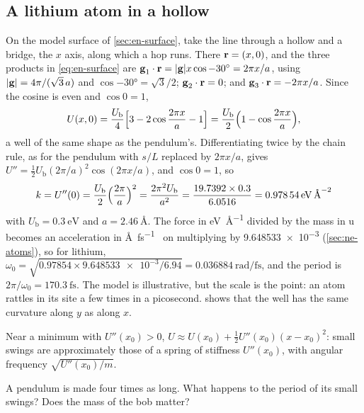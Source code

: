 \subsection*{A lithium atom in a hollow}

On the model surface of \cref{sec:en-surface}, take the line through a
hollow and a bridge, the $x$ axis, along which a hop runs. There $\bm{\mathrm{r}} =
(x, 0)$, and the three products in \cref{eq:en-surface} are $\bm{\mathrm{g}}_1\cdot
\bm{\mathrm{r}} = \lvert\bm{\mathrm{g}}\rvert x\cos\ang{-30} = 2\pi x/a$, using
$\lvert\bm{\mathrm{g}}\rvert = 4\pi/(\sqrt3\,a)$ and $\cos\ang{-30} = \sqrt3/2$;
$\bm{\mathrm{g}}_2\cdot\bm{\mathrm{r}} = 0$; and $\bm{\mathrm{g}}_3\cdot\bm{\mathrm{r}} = -2\pi x/a$. Since
the cosine is even and $\cos 0 = 1$,
\begin{equation}
   U(x, 0) = \frac{U_{\mathrm b}}{4}\Bigl[3 - 2\cos\frac{2\pi x}{a} - 1\Bigr]
   = \frac{U_{\mathrm b}}{2}\Bigl(1 - \cos\frac{2\pi x}{a}\Bigr) ,
   \label{eq:os-hop}
\end{equation}
a well of the same shape as the pendulum's. Differentiating twice by the
chain rule, as for the pendulum with $s/L$ replaced by $2\pi x/a$, gives
$U'' = \frac12 U_{\mathrm b}(2\pi/a)^2\cos(2\pi x/a)$, and $\cos 0 = 1$, so
\begin{equation*}
   k = U''(0) = \frac{U_{\mathrm b}}{2}\Bigl(\frac{2\pi}{a}\Bigr)^2
   = \frac{2\pi^2U_{\mathrm b}}{a^2}
   = \frac{19.7392\times0.3}{6.0516}
   = \SI{0.97854}{\electronvolt\per\angstrom\squared}
\end{equation*}
with $U_{\mathrm b} = \SI{0.3}{\electronvolt}$ and $a =
\SI{2.46}{\angstrom}$.
The force in \si{\electronvolt\per\angstrom} divided by the mass in
\si{\amu} becomes an acceleration in \si{\angstrom\per\femto\second
\squared} on multiplying by \num{9.648533e-3} (\cref{sec:ne-atoms}), so
for lithium, $\omega_0 = \sqrt{0.97854\times\num{9.648533e-3}/6.94} =
\SI{0.036884}{\radian\per\femto\second}$, and the period is $2\pi/\omega_0
= \SI{170.3}{\femto\second}$. The model is illustrative, but the scale is
the point: an atom rattles in its site a few times in a picosecond.
 shows that the well has the same curvature along
$y$ as along $x$.

\begin{keyidea}
Near a minimum with $U''(x_0) > 0$, $U \approx U(x_0) + \frac12
U''(x_0)(x - x_0)^2$: small swings are approximately those of a spring of stiffness
$U''(x_0)$, with angular frequency $\sqrt{U''(x_0)/m}$.
\end{keyidea}

\begin{selfcheck}
A pendulum is made four times as long. What happens to the period of its
small swings? Does the mass of the bob matter?
\end{selfcheck}
